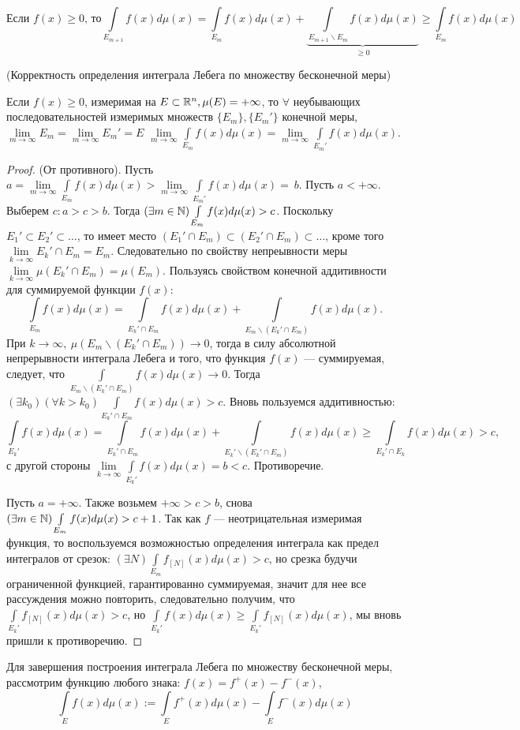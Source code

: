 \begin{corollary}
	$$\text{Если }f(x)\geqslant 0\text{, то} \int\limits_{E_{m+1}}f(x)d\mu(x) = \int\limits_{E_m}f(x)d\mu(x)+\underbrace{\int\limits_{E_{m+1}\backslash E_m}f(x)d\mu(x)}_{\geqslant 0}\geqslant\int\limits_{E_m}f(x)d\mu(x)$$
\end{corollary}

\begin{theorem}(Корректность определения интеграла Лебега по множеству бесконечной меры)
	
	Если $f(x)\geqslant0$, измеримая на $E\subset\R^n, \mu(E)=+\infty$, то $\forall$ неубывающих последовательностей измеримых множеств $\{E_m\}, \{E_m'\}$ конечной меры, $\lim\limits_{m\to\infty}E_m=\lim\limits_{m\to\infty}E_m'=E$ 
	$\lim\limits_{m\to\infty}\int\limits_{E_m}f(x)d\mu(x)=
	\lim\limits_{m\to\infty}\int\limits_{E_m'}f(x)d\mu(x)$.
\end{theorem}

\begin{proof}
	(От противного). Пусть $a=\lim\limits_{m\to\infty}\int\limits_{E_m}f(x)d\mu(x)>\lim\limits_{m\to\infty}\int\limits_{E_m'}f(x)d\mu(x)=~b$.
Пусть $a<+\infty$. Выберем $c: a>c>b$. Тогда $(\exists m\in \N)\int\limits_{E_m}f(x)d\mu(x)>c$. Поскольку $E_1'\subset E_2'\subset \ldots$, то имеет место $(E_1'\cap E_m)\subset (E_2'\cap E_m)\subset \ldots$, кроме того $ \lim\limits_{k\to\infty}E_k'\cap E_m=E_m$. Следовательно по свойству непреывности меры$\lim\limits_{k\to\infty}\mu(E_k'\cap E_m)=\mu(E_m)$. Пользуясь свойством конечной аддитивности для суммируемой функции $f(x):$\\ 
$$\int\limits_{E_m}f(x)d\mu(x)= \int\limits_{E_k'\cap E_m}f(x)d\mu(x)+\int\limits_{E_m\backslash (E_k'\cap E_m)}f(x)d\mu(x).$$ 
При $k\to\infty,\ \mu( E_m\backslash (E_k'\cap E_m))\to 0$, тогда в силу абсолютной непрерывности интеграла Лебега и того, что функция $f(x)$ --- суммируемая, следует, что $\int\limits_{E_m\backslash (E_k'\cap E_m)}f(x)d\mu(x)\to 0$. Тогда $(\exists k_0)(\forall k>k_0)\int\limits_{E_k'\cap E_m}f(x)d\mu(x)>c$. Вновь пользуемся аддитивностью:
$$\int\limits_{E_k'}f(x)d\mu(x)=\int\limits_{E_k'\cap E_m}f(x)d\mu(x)+\int\limits_{E_k'\backslash (E_k'\cap E_m)}f(x)d\mu(x)\geqslant\int\limits_{E_k'\cap E_k}f(x)d\mu(x)>c,$$ с другой стороны 
$\lim\limits_{k\to\infty}\int\limits_{E_k'}f(x)d\mu(x)=b<c$. Противоречие.

Пусть $a=+\infty$. Также возьмем $+\infty>c>b$, снова $(\exists m \in \N)\int\limits_{E_m}f(x)d\mu(x)>c+1$. Так как $f$ --- неотрицательная измеримая функция, то воспользуемся возможностью определения интеграла как предел интегралов от срезок: $(\exists N) \int\limits_{E_m}f_{[N]}(x)d\mu(x)>c$, но срезка будучи ограниченной функцией, гарантированно суммируемая, значит для нее все рассуждения можно повторить, следовательно получим, что $\int\limits_{E_k'}f_{[N]}(x)d\mu(x)>c$, но $\int\limits_{E_k'}f(x)d\mu(x)\geqslant\int\limits_{E_k'}f_{[N]}(x)d\mu(x)$, мы вновь пришли к противоречию.
\end{proof}
Для завершения построения интеграла Лебега по множеству бесконечной меры, рассмотрим функцию любого знака: $f(x)=f^+(x)-f^-(x)$,
 $$\int\limits_{E}f(x)d\mu(x):=\int\limits_{E}f^+(x)d\mu(x)-\int\limits_{E}f^-(x)d\mu(x)$$

